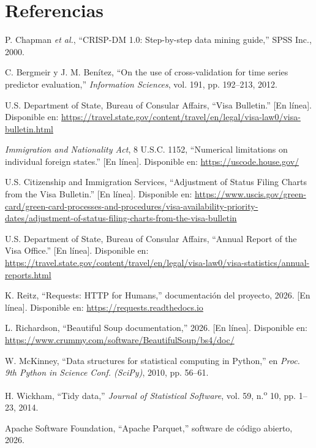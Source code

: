 \documentclass[12pt,letterpaper]{report}
\begin{document}
\chapter{Referencias}
\begin{enumerate}[label={[\arabic*]}, leftmargin=*, itemsep=2pt]
\item\label{bib:1} P. Chapman \textit{et al.}, ``CRISP-DM 1.0: Step-by-step data
mining guide,'' SPSS Inc., 2000.
\item\label{bib:2} C. Bergmeir y J. M. Benítez, ``On the use of cross-validation for time series predictor evaluation,'' \textit{Information Sciences}, vol. 191, pp. 192--213, 2012.
\item\label{bib:3} U.S. Department of State, Bureau of Consular Affairs, ``Visa Bulletin.'' [En línea].
Disponible en: \url{https://travel.state.gov/content/travel/en/legal/visa-law0/visa-bulletin.html}
\item\label{bib:4} \textit{Immigration and Nationality Act}, 8 U.S.C. 1152, ``Numerical limitations on
individual foreign states.'' [En línea]. Disponible en: \url{https://uscode.house.gov/}
\item\label{bib:5} U.S. Citizenship and Immigration Services, ``Adjustment of Status Filing Charts from
the Visa Bulletin.'' [En línea]. Disponible en:
\url{https://www.uscis.gov/green-card/green-card-processes-and-procedures/visa-availability-priority-dates/adjustment-of-status-filing-charts-from-the-visa-bulletin}
\item\label{bib:6} U.S. Department of State, Bureau of Consular Affairs, ``Annual Report of the Visa
Office.'' [En línea]. Disponible en:
\url{https://travel.state.gov/content/travel/en/legal/visa-law0/visa-statistics/annual-reports.html}
\item\label{bib:7} K. Reitz, ``Requests: HTTP for Humans,'' documentación del proyecto, 2026. [En línea].
Disponible en: \url{https://requests.readthedocs.io}
\item\label{bib:8} L. Richardson, ``Beautiful Soup documentation,'' 2026. [En línea]. Disponible en:
\url{https://www.crummy.com/software/BeautifulSoup/bs4/doc/}
\item\label{bib:9} W. McKinney, ``Data structures for statistical computing in Python,'' en
\textit{Proc. 9th Python in Science Conf. (SciPy)}, 2010, pp. 56--61.
\item\label{bib:10} H. Wickham, ``Tidy data,'' \textit{Journal of Statistical Software}, vol. 59,
n.\textsuperscript{o} 10, pp. 1--23, 2014.
\item\label{bib:11} Apache Software Foundation, ``Apache Parquet,'' software de código abierto, 2026.

\end{enumerate}
\end{document}
